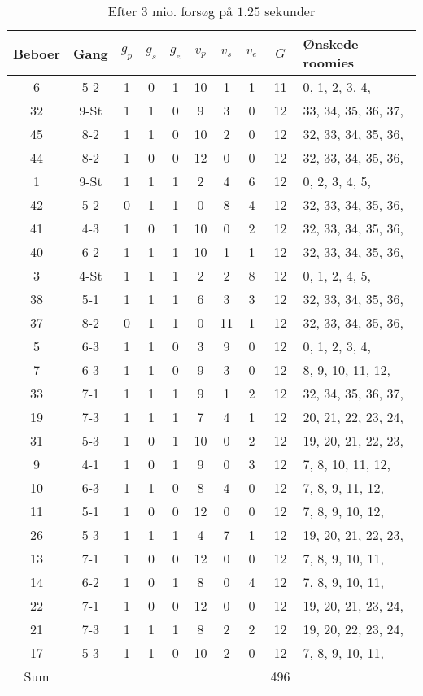 \documentclass[article,oneside,11pt,a4paper]{memoir}
\newenvironment{assignment}[1]{
\begin{table}[h]
\caption{#1}
\footnotesize
\begin{center}
\begin{tabular}{cccccccccl}
\toprule
Beboer & Gang & $g_p$ & $g_s$ & $g_e$ & $v_p$ & $v_s$ & $v_e$ & $G$ & Ønskede roomies \\ \midrule
}{
\bottomrule
\end{tabular}
\end{center}
\end{table}

}
\begin{document}
\begin{assignment}{Efter 3 mio. forsøg på $1.25$ sekunder}
     6 & 5-2  &   1 &   0 &   1 &  10 &   1 &   1 & 11 &   0,  1,  2,  3,  4, \\
    32 & 9-St &   1 &   1 &   0 &   9 &   3 &   0 & 12 &  33, 34, 35, 36, 37, \\
    45 & 8-2  &   1 &   1 &   0 &  10 &   2 &   0 & 12 &  32, 33, 34, 35, 36, \\
    44 & 8-2  &   1 &   0 &   0 &  12 &   0 &   0 & 12 &  32, 33, 34, 35, 36, \\
     1 & 9-St &   1 &   1 &   1 &   2 &   4 &   6 & 12 &   0,  2,  3,  4,  5, \\
    42 & 5-2  &   0 &   1 &   1 &   0 &   8 &   4 & 12 &  32, 33, 34, 35, 36, \\
    41 & 4-3  &   1 &   0 &   1 &  10 &   0 &   2 & 12 &  32, 33, 34, 35, 36, \\
    40 & 6-2  &   1 &   1 &   1 &  10 &   1 &   1 & 12 &  32, 33, 34, 35, 36, \\
     3 & 4-St &   1 &   1 &   1 &   2 &   2 &   8 & 12 &   0,  1,  2,  4,  5, \\
    38 & 5-1  &   1 &   1 &   1 &   6 &   3 &   3 & 12 &  32, 33, 34, 35, 36, \\
    37 & 8-2  &   0 &   1 &   1 &   0 &  11 &   1 & 12 &  32, 33, 34, 35, 36, \\
     5 & 6-3  &   1 &   1 &   0 &   3 &   9 &   0 & 12 &   0,  1,  2,  3,  4, \\
     7 & 6-3  &   1 &   1 &   0 &   9 &   3 &   0 & 12 &   8,  9, 10, 11, 12, \\
    33 & 7-1  &   1 &   1 &   1 &   9 &   1 &   2 & 12 &  32, 34, 35, 36, 37, \\
    19 & 7-3  &   1 &   1 &   1 &   7 &   4 &   1 & 12 &  20, 21, 22, 23, 24, \\
    31 & 5-3  &   1 &   0 &   1 &  10 &   0 &   2 & 12 &  19, 20, 21, 22, 23, \\
     9 & 4-1  &   1 &   0 &   1 &   9 &   0 &   3 & 12 &   7,  8, 10, 11, 12, \\
    10 & 6-3  &   1 &   1 &   0 &   8 &   4 &   0 & 12 &   7,  8,  9, 11, 12, \\
    11 & 5-1  &   1 &   0 &   0 &  12 &   0 &   0 & 12 &   7,  8,  9, 10, 12, \\
    26 & 5-3  &   1 &   1 &   1 &   4 &   7 &   1 & 12 &  19, 20, 21, 22, 23, \\
    13 & 7-1  &   1 &   0 &   0 &  12 &   0 &   0 & 12 &   7,  8,  9, 10, 11, \\
    14 & 6-2  &   1 &   0 &   1 &   8 &   0 &   4 & 12 &   7,  8,  9, 10, 11, \\
    22 & 7-1  &   1 &   0 &   0 &  12 &   0 &   0 & 12 &  19, 20, 21, 23, 24, \\
    21 & 7-3  &   1 &   1 &   1 &   8 &   2 &   2 & 12 &  19, 20, 22, 23, 24, \\
    17 & 5-3  &   1 &   1 &   0 &  10 &   2 &   0 & 12 &   7,  8,  9, 10, 11, \\
\midrule
Sum &&&&&&&& 496 & \\
\end{assignment}
\end{document}
